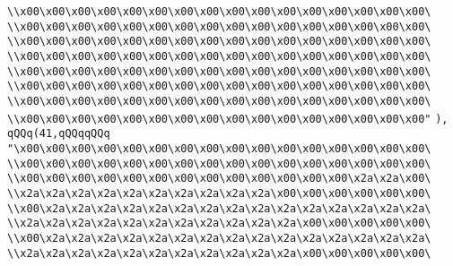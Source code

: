 \verb|\\x00\x00\x00\x00\x00\x00\x00\x00\x00\x00\x00\x00\x00\x00\x00\x00\|\newline
\verb|\\x00\x00\x00\x00\x00\x00\x00\x00\x00\x00\x00\x00\x00\x00\x00\x00\|\newline
\verb|\\x00\x00\x00\x00\x00\x00\x00\x00\x00\x00\x00\x00\x00\x00\x00\x00\|\newline
\verb|\\x00\x00\x00\x00\x00\x00\x00\x00\x00\x00\x00\x00\x00\x00\x00\x00\|\newline
\verb|\\x00\x00\x00\x00\x00\x00\x00\x00\x00\x00\x00\x00\x00\x00\x00\x00\|\newline
\verb|\\x00\x00\x00\x00\x00\x00\x00\x00\x00\x00\x00\x00\x00\x00\x00\x00\|\newline
\verb|\\x00\x00\x00\x00\x00\x00\x00\x00\x00\x00\x00\x00\x00\x00\x00\x00\|\newline
\verb|\\x00\x00\x00\x00\x00\x00\x00\x00\x00\x00\x00\x00\x00\x00\x00\x00"|\newline
\verb|),|\newline
\verb|qQQq(41,qQQqqQQq|\newline
\verb|"\x00\x00\x00\x00\x00\x00\x00\x00\x00\x00\x00\x00\x00\x00\x00\x00\|\newline
\verb|\\x00\x00\x00\x00\x00\x00\x00\x00\x00\x00\x00\x00\x00\x00\x00\x00\|\newline
\verb|\\x00\x00\x00\x00\x00\x00\x00\x00\x00\x00\x00\x00\x00\x2a\x2a\x00\|\newline
\verb|\\x2a\x2a\x2a\x2a\x2a\x2a\x2a\x2a\x2a\x2a\x00\x00\x00\x00\x00\x00\|\newline
\verb|\\x00\x2a\x2a\x2a\x2a\x2a\x2a\x2a\x2a\x2a\x2a\x2a\x2a\x2a\x2a\x2a\|\newline
\verb|\\x2a\x2a\x2a\x2a\x2a\x2a\x2a\x2a\x2a\x2a\x2a\x00\x00\x00\x00\x00\|\newline
\verb|\\x00\x2a\x2a\x2a\x2a\x2a\x2a\x2a\x2a\x2a\x2a\x2a\x2a\x2a\x2a\x2a\|\newline
\verb|\\x2a\x2a\x2a\x2a\x2a\x2a\x2a\x2a\x2a\x2a\x2a\x00\x00\x00\x00\x00\|\newline
